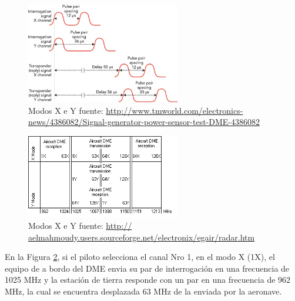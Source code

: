 \begin{figure}[!htb]
  \centering
  \includegraphics[width=0.6\textwidth]{06.radionavegacion/Imagenes/06.04.dme.imagenes/dme-modos-x-y-graficos.jpg}
  \caption{Modos X e Y
{\tiny fuente: \url{http://www.tmworld.com/electronics-news/4386082/Signal-generator-power-sensor-test-DME-4386082
}}
}
  \label{fig:DME.modos.X.e.Y.grafico}
\end{figure}


\begin{figure}[!htb]
  \centering
  \includegraphics[width=0.6\textwidth]{06.radionavegacion/Imagenes/06.04.dme.imagenes/dme-modos.gif}
  \caption{Modos X e Y
{\tiny fuente: \url{http://
aelmahmoudy.users.sourceforge.net/electronix/egair/radar.htm
}}
}
  \label{fig:DME.modos.X.e.Y}
\end{figure}


En la Figura \ref{fig:DME.modos.X.e.Y}, si el piloto selecciona el canal Nro 1, en el modo X (1X), el equipo de a bordo del DME envia su par de interrogaci\'on en una frecuencia de 1025 MHz y la estaci\'on de tierra responde con un par en una frecuencia de 962 MHz, la cual se encuentra desplazada 63 MHz de la enviada por la aeronave.

